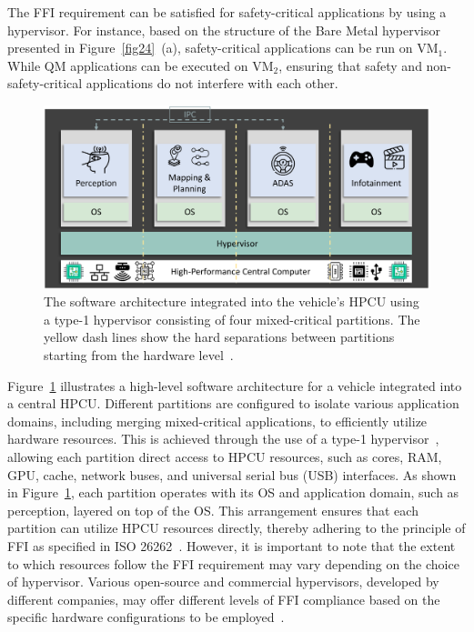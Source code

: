     The FFI requirement can be satisfied for safety-critical applications by using a hypervisor. For instance, based on the structure of the Bare Metal hypervisor presented in Figure~\ref{fig24}~(a), safety-critical applications can be run on VM$_1$. While QM applications can be executed on VM$_2$, ensuring that safety and non-safety-critical applications do not interfere with each other. 
    \begin{figure}[t]
    \centering
    \includegraphics[width= \textwidth]{figures/hpcu_arch.pdf}
    \caption{The software architecture integrated into the vehicle's HPCU using a type-1 hypervisor consisting of four mixed-critical partitions. The yellow dash lines show the hard separations between partitions starting from the hardware level~\cite{askaripoor2022architecture}.}
    \label{fig012}
    \end{figure}
    Figure~\ref{fig012} illustrates a high-level software architecture for a vehicle integrated into a central HPCU. Different partitions are configured to isolate various application domains, including merging mixed-critical applications, to efficiently utilize hardware resources. This is achieved through the use of a type-1 hypervisor~\cite{9968908}, allowing each partition direct access to HPCU resources, such as cores, RAM, GPU, cache, network buses, and universal serial bus (USB) interfaces.
    As shown in Figure~\ref{fig012}, each partition operates with its OS and application domain, such as perception, layered on top of the OS. This arrangement ensures that each partition can utilize HPCU resources directly, thereby adhering to the principle of FFI as specified in ISO 26262~\cite{iso26262}. However, it is important to note that the extent to which resources follow the FFI requirement may vary depending on the choice of hypervisor. Various open-source and commercial hypervisors, developed by different companies, may offer different levels of FFI compliance based on the specific hardware configurations to be employed~\cite{askaripoor2022architecture}.
    
